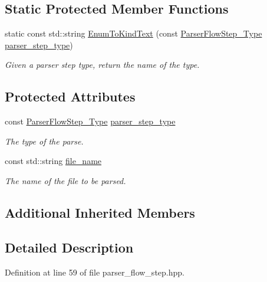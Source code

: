 \subsection*{Static Protected Member Functions}
\begin{DoxyCompactItemize}
\item 
static const std\+::string \hyperlink{classParserFlowStep_aace57969f3a1eb1432ab9f31de6da753}{Enum\+To\+Kind\+Text} (const \hyperlink{parser__flow__step_8hpp_a8e093a5d7a60426e90f01aa6e6a1aa6a}{Parser\+Flow\+Step\+\_\+\+Type} \hyperlink{classParserFlowStep_a69d47e5729f1d625614006fddaefc345}{parser\+\_\+step\+\_\+type})
\begin{DoxyCompactList}\small\item\em Given a parser step type, return the name of the type. \end{DoxyCompactList}\end{DoxyCompactItemize}
\subsection*{Protected Attributes}
\begin{DoxyCompactItemize}
\item 
const \hyperlink{parser__flow__step_8hpp_a8e093a5d7a60426e90f01aa6e6a1aa6a}{Parser\+Flow\+Step\+\_\+\+Type} \hyperlink{classParserFlowStep_a69d47e5729f1d625614006fddaefc345}{parser\+\_\+step\+\_\+type}
\begin{DoxyCompactList}\small\item\em The type of the parse. \end{DoxyCompactList}\item 
const std\+::string \hyperlink{classParserFlowStep_a728b0a03e63e3529176b848880d12c72}{file\+\_\+name}
\begin{DoxyCompactList}\small\item\em The name of the file to be parsed. \end{DoxyCompactList}\end{DoxyCompactItemize}
\subsection*{Additional Inherited Members}


\subsection{Detailed Description}


Definition at line 59 of file parser\+\_\+flow\+\_\+step.\+hpp.



